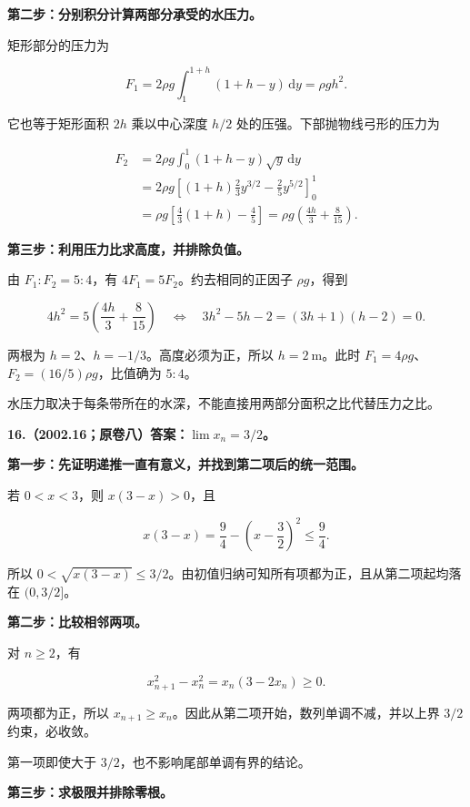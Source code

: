 \documentclass[UTF8,11pt,fontset=windows]{ctexart}
\begin{document}
\textbf{第二步：分别积分计算两部分承受的水压力。}

矩形部分的压力为

$$
F_1=2\rho g\int_1^{1+h}(1+h-y)\,\mathrm dy
=\rho g h^2.
$$

它也等于矩形面积 $2h$ 乘以中心深度 $h/2$ 处的压强。下部抛物线弓形的压力为

$$
\begin{aligned}
F_2&=2\rho g\int_0^1(1+h-y)\sqrt y\,\mathrm dy\\
&=2\rho g\left[(1+h)\frac23y^{3/2}-\frac25y^{5/2}\right]_0^1\\
&=\rho g\left[\frac43(1+h)-\frac45\right]
=\rho g\left(\frac{4h}{3}+\frac8{15}\right).
\end{aligned}
$$

\textbf{第三步：利用压力比求高度，并排除负值。}

由 $F_1:F_2=5:4$，有 $4F_1=5F_2$。约去相同的正因子 $\rho g$，得到

$$
4h^2=5\left(\frac{4h}{3}+\frac8{15}\right)
\quad\Longleftrightarrow\quad
3h^2-5h-2=(3h+1)(h-2)=0.
$$

两根为 $h=2$、$h=-1/3$。高度必须为正，所以 $\boxed{h=2\ \mathrm m}$。此时 $F_1=4\rho g$、$F_2=(16/5)\rho g$，比值确为 $5:4$。

水压力取决于每条带所在的水深，不能直接用两部分面积之比代替压力之比。

\clearpage

\textbf{16.（2002.16；原卷八）答案：$\lim x_n=3/2$。}

\textbf{第一步：先证明递推一直有意义，并找到第二项后的统一范围。}

若 $0<x<3$，则 $x(3-x)>0$，且

$$
x(3-x)=\frac94-\left(x-\frac32\right)^2\le\frac94.
$$

所以 $0<\sqrt{x(3-x)}\le3/2$。由初值归纳可知所有项都为正，且从第二项起均落在 $(0,3/2]$。

\textbf{第二步：比较相邻两项。}

对 $n\ge2$，有

$$
x_{n+1}^2-x_n^2=x_n(3-2x_n)\ge0.
$$

两项都为正，所以 $x_{n+1}\ge x_n$。因此从第二项开始，数列单调不减，并以上界 $3/2$ 约束，必收敛。

第一项即使大于 $3/2$，也不影响尾部单调有界的结论。

\textbf{第三步：求极限并排除零根。}
\end{document}
